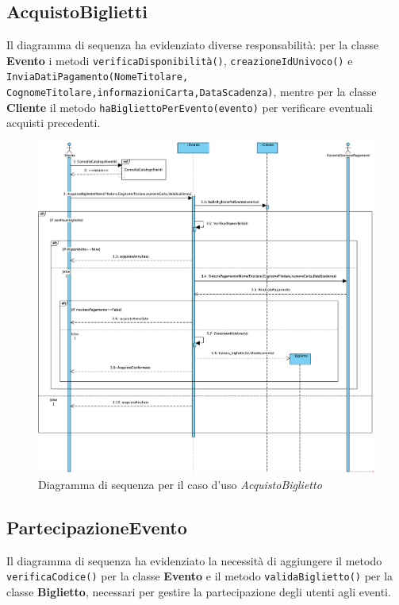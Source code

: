 \newpage
\subsection{AcquistoBiglietti}

Il diagramma di sequenza ha evidenziato diverse responsabilità: per la classe \textbf{Evento} i metodi \texttt{verificaDisponibilità()}, \texttt{creazioneIdUnivoco()} e \texttt{InviaDatiPagamento(NomeTitolare, CognomeTitolare,informazioniCarta,DataScadenza)}, mentre per la classe \textbf{Cliente} il metodo \texttt{haBigliettoPerEvento(evento)} per verificare eventuali acquisti precedenti.

\begin{figure}[H]
    \centering
    \includegraphics[width=0.8\linewidth]{assets/casid'uso/AcquistoBiglietto.png}
    \caption{Diagramma di sequenza per il caso d'uso \emph{AcquistoBiglietto}}
    \label{fig:acquistobiglietto}
\end{figure}


\newpage
\subsection{PartecipazioneEvento}

Il diagramma di sequenza ha evidenziato la necessità di aggiungere il metodo \texttt{verificaCodice()} per la classe \textbf{Evento} e il metodo \texttt{validaBiglietto()} per la classe \textbf{Biglietto}, necessari per gestire la partecipazione degli utenti agli eventi.

